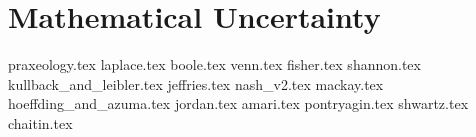 \part{Mathematical Uncertainty}

{praxeology.tex}
{laplace.tex}
{boole.tex}
{venn.tex}
{fisher.tex}
{shannon.tex}
{kullback_and_leibler.tex}
{jeffries.tex}
{nash_v2.tex}
{mackay.tex}
{hoeffding_and_azuma.tex}
{jordan.tex}
{amari.tex}
{pontryagin.tex}  
{shwartz.tex}  
{chaitin.tex}